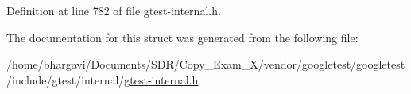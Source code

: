 Definition at line 782 of file gtest-\/internal.\+h.



The documentation for this struct was generated from the following file\+:\begin{DoxyCompactItemize}
\item 
/home/bhargavi/\+Documents/\+S\+D\+R/\+Copy\+\_\+\+Exam\+\_\+X/vendor/googletest/googletest/include/gtest/internal/\hyperlink{gtest-internal_8h}{gtest-\/internal.\+h}\end{DoxyCompactItemize}
